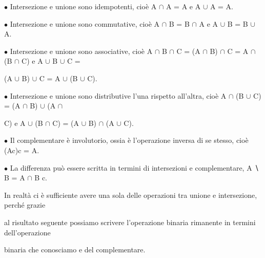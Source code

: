 \documentclass[a4paper,portrait,12pt]{article}
\begin{document}
\begin{flushleft}
$\bullet$ Intersezione e unione sono idempotenti, cio\`{e} A $\cap$ A = A e A $\cup$ A = A.
\end{flushleft}


\begin{flushleft}
$\bullet$ Intersezione e unione sono commutative, cio\`{e} A $\cap$ B = B $\cap$ A e A $\cup$ B = B $\cup$ A.
\end{flushleft}


\begin{flushleft}
$\bullet$ Intersezione e unione sono associative, cio\`{e} A $\cap$ B $\cap$ C = (A $\cap$ B) $\cap$ C = A $\cap$ (B $\cap$ C) e A $\cup$ B $\cup$ C =
\end{flushleft}


\begin{flushleft}
(A $\cup$ B) $\cup$ C = A $\cup$ (B $\cup$ C).
\end{flushleft}


\begin{flushleft}
$\bullet$ Intersezione e unione sono distributive l'una rispetto all'altra, cio\`{e} A $\cap$ (B $\cup$ C) = (A $\cap$ B) $\cup$ (A $\cap$
\end{flushleft}


\begin{flushleft}
C) e A $\cup$ (B $\cap$ C) = (A $\cup$ B) $\cap$ (A $\cup$ C).
\end{flushleft}


\begin{flushleft}
$\bullet$ Il complementare \`{e} involutorio, ossia \`{e} l'operazione inversa di se stesso, cio\`{e} (Ac)c = A.
\end{flushleft}


\begin{flushleft}
$\bullet$ La differenza pu\`{o} essere scritta in termini di intersezioni e complementare, A ∖ B = A $\cap$ B c.
\end{flushleft}


\begin{flushleft}
In realt\`{a} ci \`{e} sufficiente avere una sola delle operazioni tra unione e intersezione, perch\'{e} grazie
\end{flushleft}


\begin{flushleft}
al risultato seguente possiamo scrivere l'operazione binaria rimanente in termini dell'operazione
\end{flushleft}


\begin{flushleft}
binaria che conosciamo e del complementare.
\end{flushleft}
\end{document}
